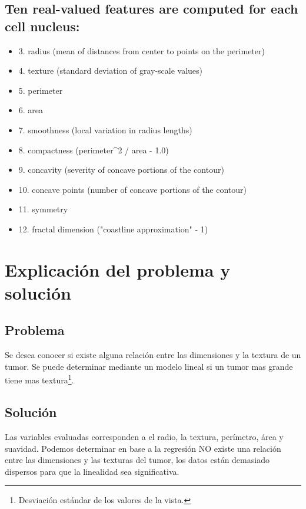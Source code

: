 \documentclass[12pt]{article}
\begin{document}
\subsection*{Ten real-valued features are computed for each cell nucleus:}
\label{sec:orgb39554a}
\begin{itemize}
\item 3. radius (mean of distances from center to points on the perimeter)
\item 4. texture (standard deviation of gray-scale values)
\item 5. perimeter
\item 6. area
\item 7. smoothness (local variation in radius lengths)
\item 8. compactness (perimeter\^{}2 / area - 1.0)
\item 9. concavity (severity of concave portions of the contour)
\item 10. concave points (number of concave portions of the contour)
\item 11. symmetry
\item 12. fractal dimension ("coastline approximation" - 1)
\end{itemize}

\section*{Explicación del problema y solución}
\label{sec:org6594de7}
\subsection*{Problema}
\label{sec:org5e55adb}
\begin{mdframed}
Se desea conocer si existe alguna relación entre las dimensiones y la textura de un tumor. Se puede determinar mediante un modelo lineal si un tumor mas grande tiene mas textura\footnote{Desviación estándar de los valores de la vista.}.
\end{mdframed}

\subsection*{Solución}
\label{sec:orge6672c6}
Las variables evaluadas corresponden a el radio, la textura, perímetro, área y suavidad. Podemos determinar en base a la regresión NO existe una relación entre las dimensiones y las texturas del tumor, los datos están demasiado dispersos para que la linealidad sea significativa. 
\end{document}
